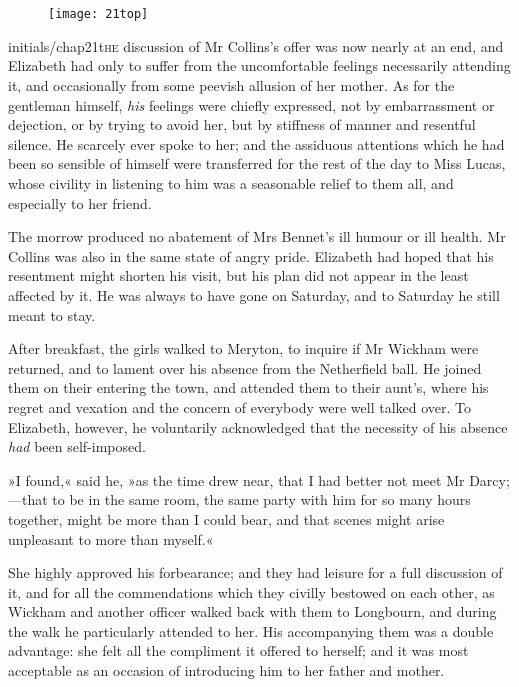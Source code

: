 
\chapter[Chapter \thechapter]{}
	
	\begin{figure}[t!]
\centering
\texttt{[image: 21top]}
\end{figure}

\lettrine[lines=6,image=true]{initials/chap21t}{he}  discussion of Mr Collins's offer was now nearly at an end, and Elizabeth had only to suffer from the uncomfortable feelings necessarily attending it, and occasionally from some peevish allusion of her mother. As for the gentleman himself, \textit{his} feelings were chiefly expressed, not by embarrassment or dejection, or by trying to avoid her, but by stiffness of manner and resentful silence. He scarcely ever spoke to her; and the assiduous attentions which he had been so sensible of himself were transferred for the rest of the day to Miss Lucas, whose civility in listening to him was a seasonable relief to them all, and especially to her friend.

The morrow produced no abatement of Mrs Bennet's ill humour or ill health. Mr Collins was also in the same state of angry pride. Elizabeth had hoped that his resentment might shorten his visit, but his plan did not appear in the least affected by it. He was always to have gone on Saturday, and to Saturday he still meant to stay.

After breakfast, the girls walked to Meryton, to inquire if Mr Wickham were returned, and to lament over his absence from the Netherfield ball. He joined them on their entering the town, and attended them to their aunt's, where his regret and vexation and the concern of everybody were well talked over. To Elizabeth, however, he voluntarily acknowledged that the necessity of his absence \textit{had} been self-imposed.

»I found,« said he, »as the time drew near, that I had better not meet Mr Darcy;—that to be in the same room, the same party with him for so many hours together, might be more than I could bear, and that scenes might arise unpleasant to more than myself.«

She highly approved his forbearance; and they had leisure for a full discussion of it, and for all the commendations which they civilly bestowed on each other, as Wickham and another officer walked back with them to Longbourn, and during the walk he particularly attended to her. His accompanying them was a double advantage: she felt all the compliment it offered to herself; and it was most acceptable as an occasion of introducing him to her father and mother.

